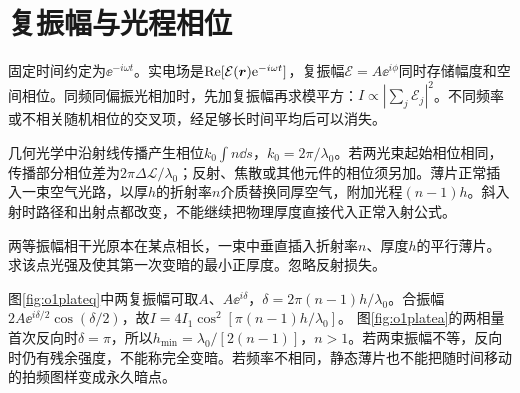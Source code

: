 \section{复振幅与光程相位}\label{th:o1phase}
固定时间约定为$\ee^{-i\omega t}$。实电场是$\operatorname{Re}[\mathcal E(\bm{r})\mathrm e^{-i\omega t}]$，复振幅$\mathcal E=A\ee^{i\phi}$同时存储幅度和空间相位。同频同偏振光相加时，先加复振幅再求模平方：$I\propto|\sum_j\mathcal E_j|^2$。不同频率或不相关随机相位的交叉项，经足够长时间平均后可以消失。

几何光学中沿射线传播产生相位$k_0\int n\dd s$，$k_0=2\pi/\lambda_0$。若两光束起始相位相同，传播部分相位差为$2\pi\Delta\mathcal L/\lambda_0$；反射、焦散或其他元件的相位须另加。薄片正常插入一束空气光路，以厚$h$的折射率$n$介质替换同厚空气，附加光程$(n-1)h$。斜入射时路径和出射点都改变，不能继续把物理厚度直接代入正常入射公式。

\begin{example}\label{ex:o1plate}
两等振幅相干光原本在某点相长，一束中垂直插入折射率$n$、厚度$h$的平行薄片。求该点光强及使其第一次变暗的最小正厚度。忽略反射损失。
\end{example}
\begin{solution}
图\ref{fig:o1plateq}中两复振幅可取$A$、$A\ee^{i\delta}$，$\delta=2\pi(n-1)h/\lambda_0$。合振幅$2A\ee^{i\delta/2}\cos(\delta/2)$，故$I=4I_1\cos^2[\pi(n-1)h/\lambda_0]$。
图\ref{fig:o1platea}的两相量首次反向时$\delta=\pi$，所以$h_{\min}=\lambda_0/[2(n-1)]$，$n>1$。若两束振幅不等，反向时仍有残余强度，不能称完全变暗。若频率不相同，静态薄片也不能把随时间移动的拍频图样变成永久暗点。
\end{solution}





